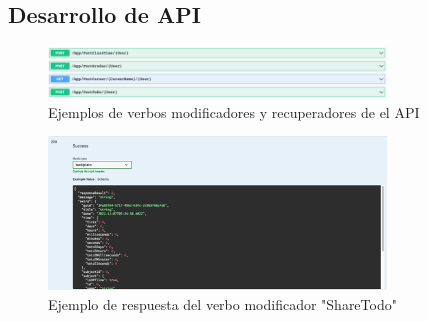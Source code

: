 \documentclass[10pt]{article}
\begin{document}
\subsection{Desarrollo de API}
\begin{figure}[H]
    \begin{center}
    \includegraphics[width=0.8\textwidth]{Imagenes/api.png}
    \caption{Ejemplos de verbos modificadores y recuperadores de el API}
\label{fig1}
    \end{center}
\end{figure} 
\begin{figure}[H]
    \begin{center}
    \includegraphics[width=0.8\textwidth]{Imagenes/api2.png}
    \caption{Ejemplo de respuesta del verbo modificador "ShareTodo"}
\label{fig1}
    \end{center}
\end{figure} 
\end{document}
